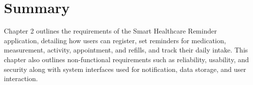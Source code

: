 \section{Summary}
\label{sec:ch2-summary}

Chapter 2 outlines the requirements of the Smart Healthcare Reminder application, detailing how users can register, set reminders for medication, measurement, activity, appointment, and refills, and track their daily intake. This chapter also outlines non-functional requirements such as reliability, usability, and security along with system interfaces used for notification, data storage, and user interaction.
